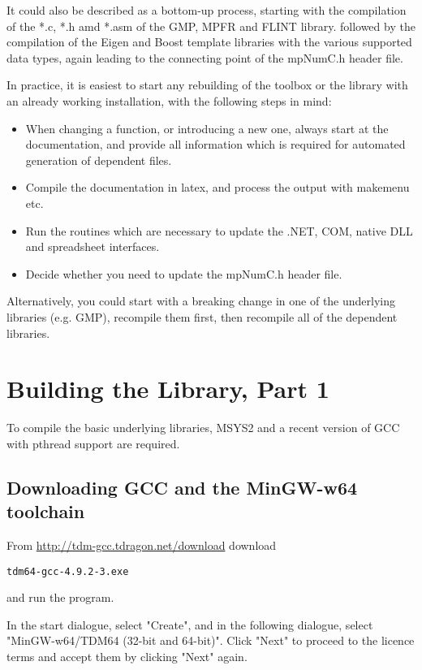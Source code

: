It could also be described as a bottom-up process, starting with the compilation of the *.c, *.h amd *.asm of the GMP, MPFR and FLINT library. followed by the compilation of the Eigen and Boost template libraries with the various supported data types, again leading  to the connecting point of the mpNumC.h header file.

In practice, it is easiest to start any rebuilding of the toolbox or the library with an already working installation, with the following steps in mind:

\begin{itemize}
	\item When changing a function, or introducing a new one, always start at the documentation, and provide all information which is required for automated generation of dependent files.
	\item Compile the documentation in latex, and process the output with makemenu etc.
	\item Run the routines which are necessary to update the .NET, COM, native DLL and spreadsheet interfaces.
	\item Decide whether you need to update the mpNumC.h header file.
\end{itemize}

Alternatively, you could start with a breaking change in one of the underlying libraries (e.g. GMP), recompile them first, then recompile all of the dependent libraries.




\newpage
\section{Building the Library, Part 1}

To compile the basic underlying libraries, MSYS2 and a recent version of GCC with pthread support are required. 


\subsection{Downloading GCC and the MinGW-w64 toolchain}

From \href{http://tdm-gcc.tdragon.net/download}{http://tdm-gcc.tdragon.net/download} download
\begin{verbatim}
tdm64-gcc-4.9.2-3.exe
\end{verbatim}
and run the program.

In the start dialogue, select "Create", and in the following dialogue, select  "MinGW-w64/TDM64 (32-bit and 64-bit)". Click "Next" to proceed to the licence terms and accept them by clicking "Next" again.

